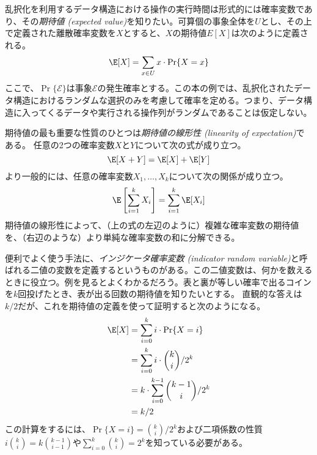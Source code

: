 乱択化を利用するデータ構造における操作の実行時間は形式的には確率変数であり、その\emph{期待値 (expected value)}を知りたい。可算個の事象全体を$U$とし、その上で定義された離散確率変数を$X$とすると、$X$の期待値$E[X]$は次のように定義される。
%
\[
    \E[X] = \sum_{x\in U} x\cdot\Pr\{X=x\}
\]
ここで、$\Pr\{\mathcal{E}\}$は事象$\mathcal{E}$の発生確率とする。この本の例では、乱択化されたデータ構造におけるランダムな選択のみを考慮して確率を定める。つまり、データ構造に入ってくるデータや実行される操作列がランダムであることは仮定しない。

期待値の最も重要な性質のひとつは\emph{期待値の線形性 (linearity of expectation)}である。
%
任意の2つの確率変数$X$と$Y$について次の式が成り立つ。
\[
   \E[X+Y] = \E[X] + \E[Y]
\]
より一般的には、任意の確率変数$ X_1,\ldots,X_k $について次の関係が成り立つ。
\[
   \E\left[\sum_{i=1}^k X_i\right] = \sum_{i=1}^k \E[X_i]
\]
期待値の線形性によって、（上の式の左辺のように）複雑な確率変数の期待値を、（右辺のような）より単純な確率変数の和に分解できる。

便利でよく使う手法に、\emph{インジケータ確率変数 (indicator random variable)}と呼ばれる二値の変数を定義するというものがある。この二値変数は、何かを数えるときに役立つ。例を見るとよくわかるだろう。表と裏が等しい確率で出るコインを$k$回投げたとき、表が出る回数の期待値を知りたいとする。
直観的な答えは$k/2$だが、これを期待値の定義を使って証明すると次のようになる。
\begin{align*}
   \E[X] & = \sum_{i=0}^k i\cdot\Pr\{X=i\} \\
         & = \sum_{i=0}^k i\cdot\binom{k}{i}/2^k \\
         & = k\cdot \sum_{i=0}^{k-1}\binom{k-1}{i}/2^k \\
         & = k/2
\end{align*}
この計算をするには、$\Pr\{X=i\} = \binom{k}{i}/2^k$および二項係数の性質$i\binom{k}{i}=k\binom{k-1}{i-1}$や$\sum_{i=0}^{k} \binom{k}{i} = 2^{k}$を知っている必要がある。

